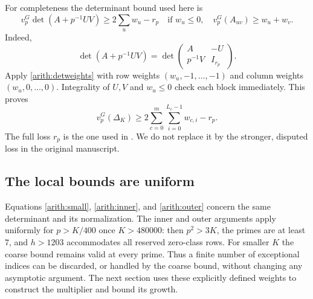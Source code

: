 For completeness the determinant bound used here is
\[
 v_p^G\det(A+p^{-1}UV)\ge2\sum_u w_u-r_p
 \quad\text{if }w_u\le0,\quad v_p^G(A_{uv})\ge w_u+w_v.
\]
Indeed,
\[
 \det(A+p^{-1}UV)=
 \det\begin{pmatrix}A&-U\\p^{-1}V&I_{r_p}\end{pmatrix}.
\]
Apply \eqref{arith:detweights} with row weights $(w_u,-1,\ldots,-1)$
and column weights $(w_u,0,\ldots,0)$. Integrality of $U,V$ and
$w_u\le0$ check each block immediately.
This proves
\begin{equation}\label{arith:outer}
 \boxed{\quad
 v_p^G(\Delta_K)\ge
 2\sum_{c=0}^m\sum_{i=0}^{L_c-1}w_{c,i}-r_p.\quad}
\end{equation}
The full loss $r_p$ is the one used in
\cite[\texttt{LowRank.lean}, \texttt{OuterFrame.lean},
\texttt{OuterEntryMain.lean}]{firsching}. We do not replace it by
the stronger, disputed loss in the original manuscript.

\subsection{The local bounds are uniform}

Equations \eqref{arith:small}, \eqref{arith:inner}, and
\eqref{arith:outer} concern the same determinant and its normalization.
The inner and outer arguments apply uniformly for $p>K/400$ once
$K>480000$: then $p^2>3K$, the primes are at least $7$, and
$h>1203$ accommodates all reserved zero-class rows.
For smaller $K$ the coarse bound remains valid at every prime.
Thus a finite number of exceptional indices can be discarded, or handled
by the coarse bound, without changing any asymptotic argument.
The next section uses these explicitly defined weights to construct
the multiplier and bound its growth.
